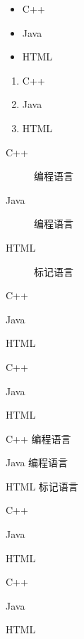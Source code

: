 \documentclass[UTF8]{article}
\begin{document}
\begin{itemize}
	\item C++
	\item Java
	\item HTML
\end{itemize}

\begin{enumerate}
	\item C++
	\item Java
	\item HTML
\end{enumerate}	
	
\begin{description}
	\item[C++] 编程语言
	\item[Java] 编程语言
	\item[HTML] 标记语言
\end{description}	

\begin{compactitem}
	\item C++
	\item Java
	\item HTML
\end{compactitem}

\begin{compactenum}
	\item C++
	\item Java
	\item HTML
\end{compactenum}	

\begin{compactdesc}
	\item[C++] 编程语言
	\item[Java] 编程语言
	\item[HTML] 标记语言
\end{compactdesc}	

\begin{inparaitem}
	\item C++
	\item Java
	\item HTML
\end{inparaitem}

\begin{inparaenum}
	\item C++
	\item Java
	\item HTML
\end{inparaenum}
\end{document}
